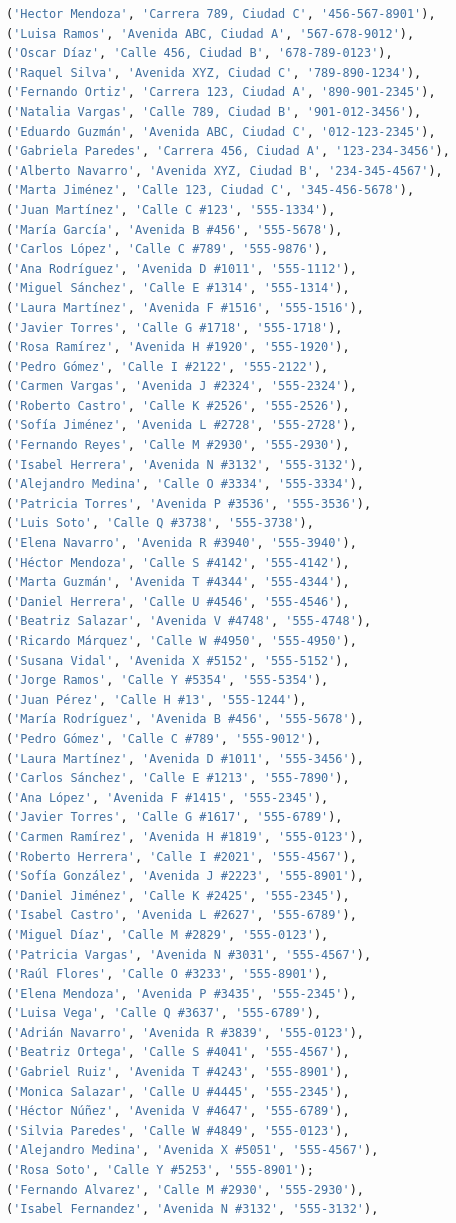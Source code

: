\documentclass[12pt]{article}
\begin{document}
\begin{lstlisting}[language=SQL]
('Hector Mendoza', 'Carrera 789, Ciudad C', '456-567-8901'),
('Luisa Ramos', 'Avenida ABC, Ciudad A', '567-678-9012'),
('Oscar Díaz', 'Calle 456, Ciudad B', '678-789-0123'),
('Raquel Silva', 'Avenida XYZ, Ciudad C', '789-890-1234'),
('Fernando Ortiz', 'Carrera 123, Ciudad A', '890-901-2345'),
('Natalia Vargas', 'Calle 789, Ciudad B', '901-012-3456'),
('Eduardo Guzmán', 'Avenida ABC, Ciudad C', '012-123-2345'),
('Gabriela Paredes', 'Carrera 456, Ciudad A', '123-234-3456'),
('Alberto Navarro', 'Avenida XYZ, Ciudad B', '234-345-4567'),
('Marta Jiménez', 'Calle 123, Ciudad C', '345-456-5678'),
('Juan Martínez', 'Calle C #123', '555-1334'),
('María García', 'Avenida B #456', '555-5678'),
('Carlos López', 'Calle C #789', '555-9876'),
('Ana Rodríguez', 'Avenida D #1011', '555-1112'),
('Miguel Sánchez', 'Calle E #1314', '555-1314'),
('Laura Martínez', 'Avenida F #1516', '555-1516'),
('Javier Torres', 'Calle G #1718', '555-1718'),
('Rosa Ramírez', 'Avenida H #1920', '555-1920'),
('Pedro Gómez', 'Calle I #2122', '555-2122'),
('Carmen Vargas', 'Avenida J #2324', '555-2324'),
('Roberto Castro', 'Calle K #2526', '555-2526'),
('Sofía Jiménez', 'Avenida L #2728', '555-2728'),
('Fernando Reyes', 'Calle M #2930', '555-2930'),
('Isabel Herrera', 'Avenida N #3132', '555-3132'),
('Alejandro Medina', 'Calle O #3334', '555-3334'),
('Patricia Torres', 'Avenida P #3536', '555-3536'),
('Luis Soto', 'Calle Q #3738', '555-3738'),
('Elena Navarro', 'Avenida R #3940', '555-3940'),
('Héctor Mendoza', 'Calle S #4142', '555-4142'),
('Marta Guzmán', 'Avenida T #4344', '555-4344'),
('Daniel Herrera', 'Calle U #4546', '555-4546'),
('Beatriz Salazar', 'Avenida V #4748', '555-4748'),
('Ricardo Márquez', 'Calle W #4950', '555-4950'),
('Susana Vidal', 'Avenida X #5152', '555-5152'),
('Jorge Ramos', 'Calle Y #5354', '555-5354'),
('Juan Pérez', 'Calle H #13', '555-1244'),
('María Rodríguez', 'Avenida B #456', '555-5678'),
('Pedro Gómez', 'Calle C #789', '555-9012'),
('Laura Martínez', 'Avenida D #1011', '555-3456'),
('Carlos Sánchez', 'Calle E #1213', '555-7890'),
('Ana López', 'Avenida F #1415', '555-2345'),
('Javier Torres', 'Calle G #1617', '555-6789'),
('Carmen Ramírez', 'Avenida H #1819', '555-0123'),
('Roberto Herrera', 'Calle I #2021', '555-4567'),
('Sofía González', 'Avenida J #2223', '555-8901'),
('Daniel Jiménez', 'Calle K #2425', '555-2345'),
('Isabel Castro', 'Avenida L #2627', '555-6789'),
('Miguel Díaz', 'Calle M #2829', '555-0123'),
('Patricia Vargas', 'Avenida N #3031', '555-4567'),
('Raúl Flores', 'Calle O #3233', '555-8901'),
('Elena Mendoza', 'Avenida P #3435', '555-2345'),
('Luisa Vega', 'Calle Q #3637', '555-6789'),
('Adrián Navarro', 'Avenida R #3839', '555-0123'),
('Beatriz Ortega', 'Calle S #4041', '555-4567'),
('Gabriel Ruiz', 'Avenida T #4243', '555-8901'),
('Monica Salazar', 'Calle U #4445', '555-2345'),
('Héctor Núñez', 'Avenida V #4647', '555-6789'),
('Silvia Paredes', 'Calle W #4849', '555-0123'),
('Alejandro Medina', 'Avenida X #5051', '555-4567'),
('Rosa Soto', 'Calle Y #5253', '555-8901');
('Fernando Alvarez', 'Calle M #2930', '555-2930'),
('Isabel Fernandez', 'Avenida N #3132', '555-3132'),


\end{lstlisting}
\end{document}
